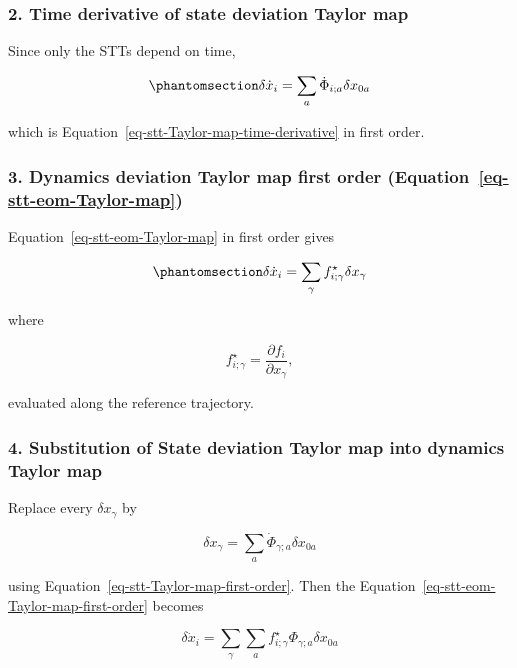 \documentclass[
  letterpaper,
  DIV=11,
  numbers=noendperiod,
  oneside]{scrartcl}
\begin{document}
\subsubsection{2. Time derivative of state deviation Taylor
map}\label{time-derivative-of-state-deviation-taylor-map}

Since only the STTs depend on time,

\begin{equation}\protect\phantomsection\label{eq-stt-Taylor-map-time-derivative-first-order}{
\delta\dot x_i = \sum_a \dot\Phi_{i;a}\delta x_{0a}
}\end{equation}

which is Equation~\ref{eq-stt-Taylor-map-time-derivative} in first
order.

\subsubsection{\texorpdfstring{3. Dynamics deviation Taylor map first
order
(Equation~\ref{eq-stt-eom-Taylor-map})}{3. Dynamics deviation Taylor map first order (Equation~)}}\label{dynamics-deviation-taylor-map-first-order-eq-stt-eom-taylor-map}

Equation~\ref{eq-stt-eom-Taylor-map} in first order gives

\begin{equation}\protect\phantomsection\label{eq-stt-eom-Taylor-map-first-order}{
\delta\dot x_i = \sum_{\gamma} f^\star_{i;\gamma}\delta x_\gamma
}\end{equation}

where

\[
f^\star_{i;\gamma}=\frac{\partial f_i}{\partial x_\gamma},
\]

evaluated along the reference trajectory.

\subsubsection{4. Substitution of State deviation Taylor map into
dynamics Taylor
map}\label{substitution-of-state-deviation-taylor-map-into-dynamics-taylor-map}

Replace every \(\delta x_\gamma\) by

\[
\delta x_\gamma=\sum_a \dot\Phi_{\gamma;a}\delta x_{0a}
\]

using Equation~\ref{eq-stt-Taylor-map-first-order}. Then the
Equation~\ref{eq-stt-eom-Taylor-map-first-order} becomes

\[
\delta\dot x_i = \sum_{\gamma} \sum_a f^\star_{i;\gamma}\Phi_{\gamma;a}\delta x_{0a}
\]
\end{document}

